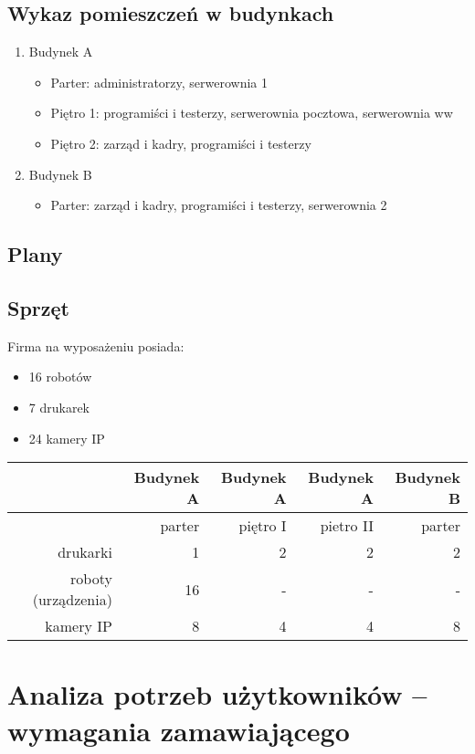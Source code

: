\documentclass{article}
\begin{document}
\subsection{Wykaz pomieszczeń w budynkach}
\begin{enumerate}
	\item Budynek A
	\begin{itemize}
		\item Parter: administratorzy, serwerownia 1
		\item Piętro 1: programiści i testerzy, serwerownia pocztowa, serwerownia ww
		\item Piętro 2: zarząd i kadry, programiści i testerzy
	\end{itemize}
	\item Budynek B
		\begin{itemize}
		\item Parter: zarząd i kadry, programiści i testerzy, serwerownia 2
	\end{itemize}
\end{enumerate}
\subsection{Plany}
\subsection{Sprzęt}
Firma na wyposażeniu posiada:
\begin{itemize}
	\item 16 robotów
	\item 7 drukarek
	\item 24 kamery IP
\end{itemize}
\begin{tabular}{|r|r|r|r|r|}\hline
	& Budynek A & Budynek A & Budynek A & 	Budynek B 	\\
	\hline
 & parter & piętro I & pietro II & parter \\
 \hline
drukarki & 1 & 2 & 2 & 2\\
\hline
roboty (urządzenia) & 16 & - & - & - \\
\hline
kamery IP & 8 & 4 & 4 & 8 \\
\hline
\end{tabular}
\section{Analiza potrzeb użytkowników – wymagania zamawiającego}
\end{document}

